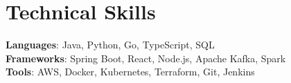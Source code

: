 \documentclass[letterpaper,11pt]{article}
\begin{document}
\section{Technical Skills}
 \begin{itemize}[leftmargin=0.15in, label={}]
    \small{\item{
     \textbf{Languages}{: Java, Python, Go, TypeScript, SQL} \\
     \textbf{Frameworks}{: Spring Boot, React, Node.js, Apache Kafka, Spark} \\
     \textbf{Tools}{: AWS, Docker, Kubernetes, Terraform, Git, Jenkins}
    }}
 \end{itemize}
\end{document}

